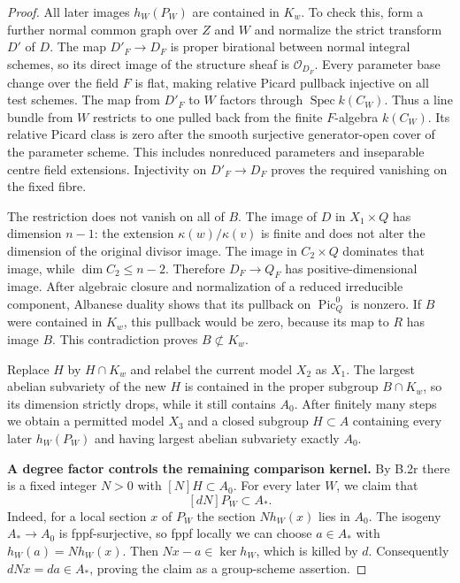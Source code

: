 \begin{proof}
All later images $h_W(P_W)$ are contained in $K_w$.
To check this, form a further normal common graph over $Z$
and $W$ and normalize the strict transform $D'$ of $D$.
The map $D'_F\to D_F$ is proper birational between normal
integral schemes, so its direct image of the structure sheaf
is $\mathcal O_{D_F}$.  Every parameter base change over the
field $F$ is flat, making relative Picard pullback injective
on all test schemes.  The map from $D'_F$ to $W$ factors
through $\operatorname{Spec}k(C_W)$.
Thus a line bundle from $W$ restricts to one pulled back
from the finite $F$-algebra $k(C_W)$.
Its relative Picard class is zero after the smooth
surjective generator-open cover of the parameter scheme.
This includes nonreduced parameters and inseparable centre
field extensions.  Injectivity on $D'_F\to D_F$ proves the
required vanishing on the fixed fibre.

The restriction does not vanish on all of $B$.
The image of $D$ in $X_1\times Q$ has dimension $n-1$:
the extension $\kappa(w)/\kappa(v)$ is finite and does not
alter the dimension of the original divisor image.
The image in $C_2\times Q$ dominates that image, while
$\dim C_2\le n-2$.
Therefore $D_F\to Q_F$ has positive-dimensional image.
After algebraic closure and normalization of a reduced
irreducible component, Albanese duality shows that its
pullback on $\operatorname{Pic}^0_Q$ is nonzero.
If $B$ were contained in $K_w$, this pullback would be zero,
because its map to $R$ has image $B$.  This contradiction
proves $B\not\subset K_w$.

Replace $H$ by $H\cap K_w$ and relabel the current model
$X_2$ as $X_1$.  The largest abelian subvariety of the new
$H$ is contained in the proper subgroup $B\cap K_w$, so
its dimension strictly drops, while it still contains $A_0$.
After finitely many steps we obtain a permitted model $X_3$
and a closed subgroup $H\subset A$ containing every later
$h_W(P_W)$ and having largest abelian subvariety exactly $A_0$.

\par\smallskip\noindent\textbf{A degree factor controls the remaining comparison kernel.}\quad
By B.2r there is a fixed integer $N>0$ with
$[N]H\subset A_0$.
For every later $W$, we claim that
\[
                         [dN]P_W\subset A_*.
\]
Indeed, for a local section $x$ of $P_W$ the section
$N h_W(x)$ lies in $A_0$.
The isogeny $A_*\to A_0$ is fppf-surjective, so fppf locally
we can choose $a\in A_*$ with $h_W(a)=N h_W(x)$.
Then $Nx-a\in\ker h_W$, which is killed by $d$.
Consequently $dNx=da\in A_*$, proving the claim as a
group-scheme assertion.


\end{proof}
